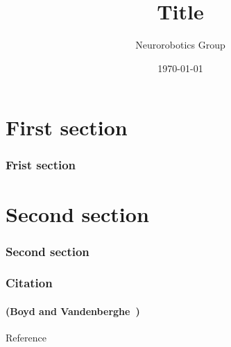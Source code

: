 \documentclass[aspectratio=3218,10pt,usepdftitle=false]{beamer}
\title{Title}
\author{Neurorobotics Group}
\institute{Department of Computer Science\\University of Freiburg}
\date{\today}
\begin{document}
\begin{frame}[plain]
    \titlepage{}
\end{frame}

\section{First section}
\begin{frame}
    \frametitle{Frist section}
    
\end{frame}

\section{Second section}
\begin{frame}
    \frametitle{Second section}

\end{frame}

\begin{frame}
    \frametitle{Citation}
    \framesubtitle{(Boyd and Vandenberghe~\cite{boyd2004convex})}

\end{frame}

\begin{frame}[plain]{Reference}
    \footnotesize
    \nocite{*}
    
\end{frame}
\end{document}
